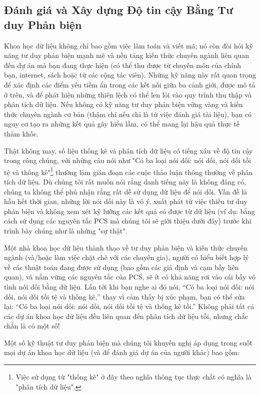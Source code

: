 \subsection{Đánh giá và Xây dựng Độ tin cậy Bằng Tư duy Phản biện}

Khoa học dữ liệu không chỉ bao gồm việc làm toán và viết mã; nó còn đòi hỏi kỹ năng tư duy phản biện mạnh mẽ và nền tảng kiến thức chuyên ngành liên quan đến dự án mà bạn đang thực hiện (có thể thu được từ chuyên môn của chính bạn, internet, sách hoặc từ các cộng tác viên). Những kỹ năng này rất quan trọng để xác định các điểm yếu tiềm ẩn trong các kết nối giữa ba cảnh giới, được mô tả ở trên, và để phát hiện những thiên lệch có thể len lỏi vào quy trình thu thập và phân tích dữ liệu. Nếu không có kỹ năng tư duy phản biện vững vàng và kiến thức chuyên ngành cơ bản (thậm chí nếu chỉ là từ việc đánh giá tài liệu), bạn có nguy cơ tạo ra những kết quả gây hiểu lầm, có thể mang lại hậu quả thực tế thảm khốc.

Thật không may, số liệu thống kê và phân tích dữ liệu có tiếng xấu về độ tin cậy trong công chúng, với những câu nói như "Có ba loại nói dối: nói dối, nói dối tồi tệ và thống kê"\footnote{Việc sử dụng từ "thống kê" ở đây theo nghĩa thông tục thực chất có nghĩa là "phân tích dữ liệu".} thường làm gián đoạn các cuộc thảo luận thông thường về phân tích dữ liệu. Dù chúng tôi rất muốn nói rằng danh tiếng này là không đáng có, chúng ta không thể phủ nhận rằng rất dễ sử dụng dữ liệu để nói dối. Vấn đề là hầu hết thời gian, những lời nói dối này là vô ý, xuất phát từ việc thiếu tư duy phản biện và không xem xét kỹ lưỡng các kết quả có được từ dữ liệu (ví dụ: bằng cách sử dụng các nguyên tắc PCS mà chúng tôi sẽ giới thiệu dưới đây) trước khi trình bày chúng như là những "sự thật".

Một nhà khoa học dữ liệu thành thạo về tư duy phản biện và kiến thức chuyên ngành (và/hoặc làm việc chặt chẽ với các chuyên gia), người có hiểu biết hợp lý về các thuật toán đang được sử dụng (bao gồm các giả định và cạm bẫy liên quan), và nắm vững các nguyên tắc của PCS, sẽ ít có khả năng rơi vào cái bẫy vô tình nói dối bằng dữ liệu. Lần tới khi bạn nghe ai đó nói, “Có ba loại nói dối: nói dối, nói dối tồi tệ và thống kê,” thay vì cảm thấy bị xúc phạm, bạn có thể sửa lại: “Có ba loại nói dối: nói dối, nói dối tồi tệ và thống kê tồi.” Không phải tất cả các dự án khoa học dữ liệu đều liên quan đến phân tích dữ liệu tồi, nhưng chắc chắn là có một số!

Một số kỹ thuật tư duy phản biện mà chúng tôi khuyến nghị áp dụng trong suốt mọi dự án khoa học dữ liệu (và để đánh giá dự án của người khác) bao gồm:

